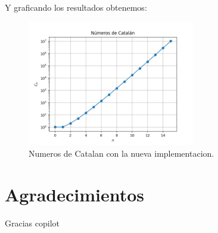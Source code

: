 \documentclass[../portafolio.tex]{subfiles}
\begin{document}
Y graficando los resultados obtenemos:

\begin{figure}[ht]
  \centering
  \includegraphics[width=0.65\textwidth]{img/Catmejor.png}
  \caption{Numeros de Catalan con la nueva implementacion.}
  \label{fig:catalan_mejor}
\end{figure}

\section*{Agradecimientos}

Gracias copilot
\end{document}
